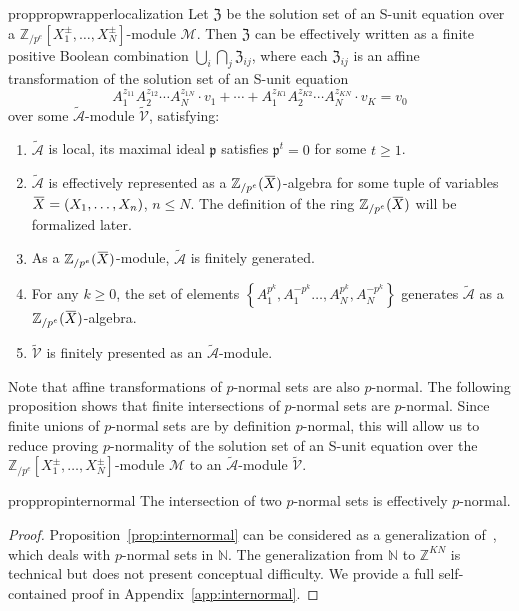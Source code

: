 \documentclass[letterpaper, 11pt, thm-restate]{article}
\numberwithin{equation}{section}
\newcommand{\Z}{\mathbb{Z}}
\newcommand{\N}{\mathbb{N}}
\newcommand{\Zpe}{\mathbb{Z}_{/p^e}}
\newcommand{\mM}{\mathcal{M}}
\newcommand{\mZ}{\mathfrak{Z}}
\newcommand{\tmA}{\widetilde{\mathcal{A}}}
\newcommand{\tmV}{\widetilde{\mathcal{V}}}
\newcommand{\oX}{\mkern 1.5mu\overline{\mkern-1.5mu X \mkern-1.5mu}\mkern 1.5mu}
\newcommand{\frp}{\mathfrak{p}}
\theoremstyle{definition}
\theoremstyle{definition}
\theoremstyle{definition}
\begin{document}
\begin{restatable}{prop}{propwrapperlocalization}\label{prop:wrapperlocalization}
    Let $\mZ$ be the solution set of an S-unit equation over a $\Zpe[X_1^{\pm}, \ldots, X_N^{\pm}]$-module $\mM$.
    Then $\mZ$ can be effectively written as a finite positive Boolean combination $\bigcup_i \bigcap_j \mZ_{ij}$, where each $\mZ_{ij}$ is an affine transformation of the solution set of an S-unit equation
    \[
    A_1^{z_{11}} A_2^{z_{12}} \cdots A_N^{z_{1N}} \cdot v_1 + \cdots + A_1^{z_{K1}} A_2^{z_{K2}} \cdots A_N^{z_{KN}} \cdot v_K = v_0
    \]
    over some $\tmA$-module $\tmV$, satisfying:
    \begin{enumerate}[nosep, label = (\roman*)]
        \item $\tmA$ is local, its maximal ideal $\frp$ satisfies $\frp^t = 0$ for some $t \geq 1$.
        \item $\tmA$ is effectively represented as a $\Zpe(\oX)$-algebra for some tuple of variables $\oX = (X_1, \ldots, X_n)$, $n \leq N$. The definition of the ring $\Zpe(\oX)$ will be formalized later. 
        \item As a $\Zpe(\oX)$-module, $\tmA$ is finitely generated.
        \item For any $k \geq 0$, the set of elements $\left\{A_1^{p^k}, A_1^{-p^k} \ldots, A_N^{p^k}, A_N^{-p^k}\right\}$ generates $\tmA$ as a $\Zpe(\oX)$-algebra.
        \item $\tmV$ is finitely presented as an $\tmA$-module.
    \end{enumerate}
\end{restatable}

Note that affine transformations of $p$-normal sets are also $p$-normal.
The following proposition shows that finite intersections of $p$-normal sets are $p$-normal.
Since finite unions of $p$-normal sets are by definition $p$-normal, this will allow us to reduce proving $p$-normality of the solution set of an S-unit equation over the $\Zpe[X_1^{\pm}, \ldots, X_N^{\pm}]$-module $\mM$ to an $\tmA$-module $\tmV$.

\begin{restatable}{prop}{propinternormal}\label{prop:internormal}
    The intersection of two $p$-normal sets is effectively $p$-normal.
\end{restatable}
\begin{proof}
    Proposition~\ref{prop:internormal} can be considered as a generalization of~\cite[Lemma~9.5]{derksen2007skolem}, which deals with $p$-normal sets in $\N$.
    The generalization from $\N$ to $\Z^{KN}$ is technical but does not present conceptual difficulty.
    We provide a full self-contained proof in Appendix~\ref{app:internormal}.
\end{proof}
\end{document}
